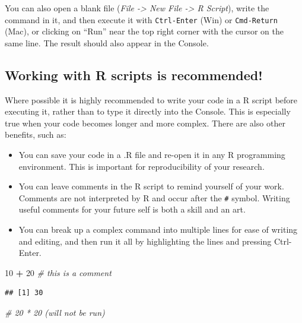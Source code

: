\documentclass[
]{book}
\newenvironment{Shaded}{\begin{snugshade}}{\end{snugshade}}
\newcommand{\CommentTok}[1]{\textcolor[rgb]{0.56,0.35,0.01}{\textit{#1}}}
\newcommand{\DecValTok}[1]{\textcolor[rgb]{0.00,0.00,0.81}{#1}}
\newcommand{\SpecialCharTok}[1]{\textcolor[rgb]{0.81,0.36,0.00}{\textbf{#1}}}
\providecommand{\tightlist}{%
  \setlength{\itemsep}{0pt}\setlength{\parskip}{0pt}}
\begin{document}
You can also open a blank file (\emph{File -\textgreater{} New File -\textgreater{} R Script}), write the command in it, and then execute it with \texttt{Ctrl-Enter} (Win) or \texttt{Cmd-Return} (Mac), or clicking on ``Run'' near the top right corner with the cursor on the same line. The result should also appear in the Console.

\subsection{Working with R scripts is recommended!}\label{working-with-r-scripts-is-recommended}

Where possible it is highly recommended to write your code in a R script before executing it, rather than to type it directly into the Console. This is especially true when your code becomes longer and more complex. There are also other benefits, such as:

\begin{itemize}
\tightlist
\item
  You can save your code in a .R file and re-open it in any R programming environment. This is important for reproducibility of your research.
\item
  You can leave comments in the R script to remind yourself of your work. Comments are not interpreted by R and occur after the \texttt{\#} symbol. Writing useful comments for your future self is both a skill and an art.
\item
  You can break up a complex command into multiple lines for ease of writing and editing, and then run it all by highlighting the lines and pressing Ctrl-Enter.
\end{itemize}

\begin{Shaded}
\begin{Highlighting}[]
\DecValTok{10} \SpecialCharTok{+} \DecValTok{20} \CommentTok{\# this is a comment}
\end{Highlighting}
\end{Shaded}

\begin{verbatim}
## [1] 30
\end{verbatim}

\begin{Shaded}
\begin{Highlighting}[]
\CommentTok{\# 20 * 20 (will not be run)}
\end{Highlighting}
\end{Shaded}
\end{document}
